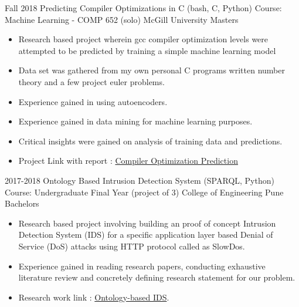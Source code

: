 \documentclass[11pt,a4paper,sans]{moderncv} %
\begin{document}
        \cventry
            {Fall 2018} %
            {Predicting Compiler Optimizations in C (bash, C, Python)} %
            {Course: Machine Learning - COMP 652 (solo)} %
            {McGill University} %
            {Masters} 
            {
                \begin{itemize} %
                    \item Research based project wherein gcc compiler optimization levels were attempted to be predicted by training a simple machine learning model
                    \item Data set was gathered from my own personal C programs written number theory and a few project euler problems.
                    \item Experience gained in using autoencoders. 
                    \item Experience gained in data mining for machine learning purposes. 
                    \item Critical insights were gained on analysis of training data and predictions. 
                    \item Project Link with report : \href{https://github.com/jaag5678/CompOptML.git}{Compiler Optimization Prediction}
                \end{itemize}
            }
            {}

        \cventry
            {2017-2018} %
            {Ontology Based Intrusion Detection System (SPARQL, Python)} %
            {Course: Undergraduate Final Year (project of 3)} %
            {College of Engineering Pune} %
            {Bachelors} 
            {
                \begin{itemize} %
                    \item Research based project involving building an proof of concept Intrusion Detection System (IDS) for a specific application layer based Denial of Service (DoS) attacks using HTTP protocol called as SlowDos.
                    \item Experience gained in reading research papers, conducting exhaustive literature review and concretely defining research statement for our problem. 
                    \item Research work link : \href{https://github.com/Chromares/IDS_Ontology.git}{Ontology-based IDS}.
                \end{itemize}
            }
            {}
\end{document}
